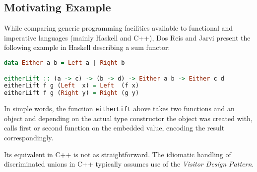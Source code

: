 \documentclass[preprint]{sigplanconf}
\DeclareRobustCommand{\codehaskell}[1]{{\lstinline[breaklines=false,language=Haskell]{#1}}}
\begin{document}


\subsection{Motivating Example}
\label{sec:xmlp}

While comparing generic programming facilities available to functional and 
imperative languages (mainly Haskell and C++), Dos Reis and Jarvi present the 
following example in Haskell describing a sum functor\cite{DRJ05}:

\begin{lstlisting}[language=Haskell]
data Either a b = Left a | Right b

eitherLift :: (a -> c) -> (b -> d) -> Either a b -> Either c d
eitherLift f g (Left  x) = Left  (f x)
eitherLift f g (Right y) = Right (g y)
\end{lstlisting}

In simple words, the function \codehaskell{eitherLift} above takes two functions and an 
object and depending on the actual type constructor the object was created with, 
calls first or second function on the embedded value, encoding the result 
correspondingly.

Its equivalent in C++ is not as straightforward. The idiomatic handling of 
discriminated unions in C++ typically assumes use of the \emph{Visitor Design 
Pattern}\cite{DesignPatterns1993}.
\end{document}
